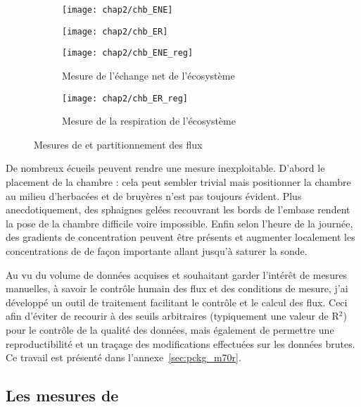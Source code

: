 \begin{figure}
	\centering
	\begin{subfigure}[t]{0.5\textwidth}
		\centering
		\texttt{[image: chap2/chb\_ENE]}
	\end{subfigure}%
	\begin{subfigure}[t]{0.5\textwidth}
		\centering
		\texttt{[image: chap2/chb\_ER]}
	\end{subfigure}%

	\begin{subfigure}[t]{0.5\textwidth}
		\texttt{[image: chap2/chb\_ENE\_reg]}
		\caption{Mesure de l'échange net de l'écosystème}
	\end{subfigure}%
	\begin{subfigure}[t]{0.5\textwidth}
		\texttt{[image: chap2/chb\_ER\_reg]}
		\caption{Mesure de la respiration de l'écosystème}
	\end{subfigure}
\caption{Mesures de \coo et partitionnement des flux}
\label{fig:chb}
\end{figure}


De nombreux écueils peuvent rendre une mesure inexploitable. D'abord le placement de la chambre : cela peut sembler trivial mais positionner la chambre au milieu d'herbacées et de bruyères n'est pas toujours évident. 
Plus anecdotiquement, des sphaignes gelées recouvrant les bords de l'embase rendent la pose de la chambre difficile voire impossible. 
Enfin selon l'heure de la journée, des gradients de concentration peuvent être présents et augmenter localement les concentrations de \coo de façon importante allant jusqu'à saturer la sonde.

Au vu du volume de données acquises et souhaitant garder l'intérêt de mesures manuelles, à savoir le contrôle humain des flux et des conditions de mesure, j'ai développé un outil de traitement facilitant le contrôle et le calcul des flux.
Ceci afin d'éviter de recourir à des seuils arbitraires (typiquement une valeur de R$^{2}$) pour le contrôle de la qualité des données, mais également de permettre une reproductibilité et un traçage des modifications effectuées sur les données brutes.
Ce travail est présenté dans l'annexe~\ref{sec:pckg_m70r}.

\subsection{Les mesures de \texorpdfstring{\chh}{CH4}}

